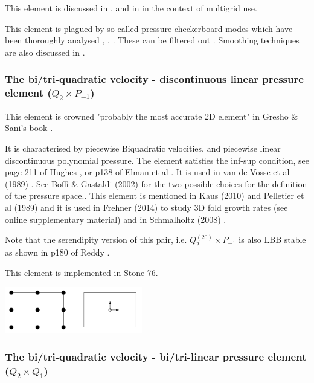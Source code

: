 This element is discussed in \cite{fort81}, \cite{fofo85} and in \cite{pisa85} 
in the context of multigrid use.

This element is plagued by so-called pressure checkerboard modes which
have been thoroughly analysed \cite{grsi94}, \cite{chpc95}, \cite{sagl81a,sagl81b}.
These can be filtered out \cite{chpc95}. Smoothing techniques are also discussed in \cite{legs79}.

\Literature \cite{fobo90}\cite{grle85}\cite{leru86}



\subsubsection{The bi/tri-quadratic velocity - discontinuous linear pressure element ($Q_2 \times P_{-1}$)}

This element is crowned "probably the most accurate 2D element" in Gresho \& Sani's book \cite{grsa}.

It is characterised by piecewise Biquadratic velocities, 
and piecewise linear discontinuous polynomial pressure. 
The element satisfies the inf-sup condition, see page 211 of Hughes \cite{hugh}, or p138 of Elman et al
\cite{elsw}.
It is used in van de Vosse et al (1989) \cite{vavs89}. 
See Boffi \& Gastaldi (2002) \cite{boga02} 
for the two possible choices for the definition of the pressure space..
This element is mentioned in Kaus (2010) \cite{kaus10} and Pelletier et al (1989) \cite{pefc89} 
and it is  used in Frehner (2014) \cite{freh14} to study 3D fold growth rates 
(see online supplementary material) and in Schmalholtz (2008) \cite{schm08}.

Note that the serendipity version of this pair, i.e. $Q_2^{(20)}\times P_{-1}$ is also LBB stable
as shown in p180 of Reddy \cite{reddybook2}.

This element is implemented in Stone 76. 

\begin{center}
\includegraphics[width=6cm]{images/q2pm1/q2pm1}
\end{center}


\subsubsection{The bi/tri-quadratic velocity - bi/tri-linear pressure element ($Q_2 \times Q_1$)}
\label{ss:pairq2q1}

